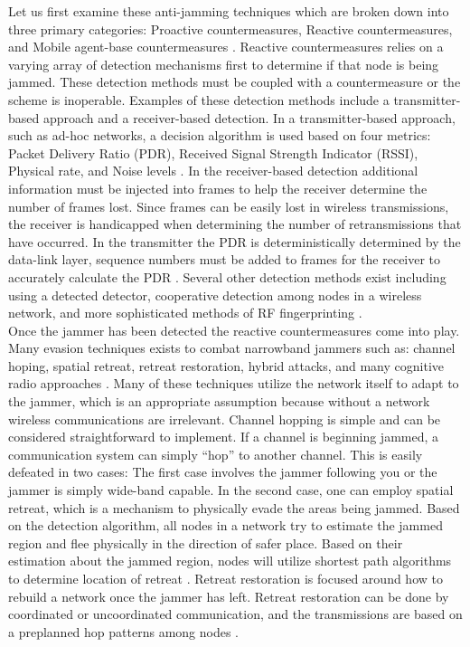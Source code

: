 Let us first examine these anti-jamming techniques which are broken down into three primary categories: Proactive countermeasures, Reactive countermeasures, and Mobile agent-base countermeasures \cite{1}.  Reactive countermeasures relies on a varying array of detection mechanisms first to determine if that node is being jammed.  These detection methods  must be coupled with a countermeasure or the scheme is inoperable.  Examples of these detection methods include a transmitter-based approach and a receiver-based detection\cite{detjam}.  In a transmitter-based approach, such as ad-hoc networks, a decision algorithm is used based on four metrics: Packet Delivery Ratio (PDR), Received Signal Strength Indicator (RSSI), Physical rate, and Noise levels \cite{3}.  In the receiver-based detection additional information must be injected into frames to help the receiver determine the number of frames lost.  Since frames can be easily lost in wireless transmissions, the receiver is handicapped when determining the number of retransmissions that have occurred.  In the transmitter the PDR is deterministically determined by the data-link layer, sequence numbers must be added to frames for the receiver to accurately calculate the PDR \cite{3}.  Several other detection methods exist including using a detected detector, cooperative detection among nodes in a wireless network, and more sophisticated methods of RF fingerprinting \cite{3}.\\

Once the jammer has been detected the reactive countermeasures come into play.  Many evasion techniques exists to combat narrowband jammers such as: channel hoping, spatial retreat, retreat restoration, hybrid attacks, and many cognitive radio approaches \cite{2}.  Many of these techniques utilize the network itself to adapt to the jammer, which is an appropriate assumption because without a network wireless communications are irrelevant.  Channel hopping is simple and can be considered straightforward to implement.  If a channel is beginning jammed, a communication system can simply ``hop'' to another channel.  This is easily defeated in two cases: The first case involves the jammer following you or the jammer is simply wide-band capable.  In the second case, one can employ spatial retreat, which is a mechanism to physically evade the areas being jammed. Based on the detection algorithm, all nodes in a network try to estimate the jammed region and flee physically in the direction of safer place. Based on their estimation about the jammed region, nodes will utilize shortest path algorithms to determine location of retreat \cite{5}.  Retreat restoration is focused around how to rebuild a network once the jammer has left.  Retreat restoration can be done by coordinated or uncoordinated communication, and the transmissions are based on a preplanned hop patterns among nodes \cite{6}.\\

